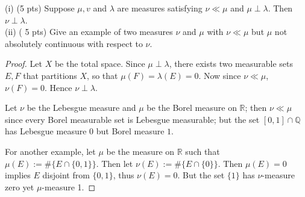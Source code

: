 
\begin{problem}
	(i) (5 pts) Suppose $\mu, v$ and $\lambda$ are measures satisfying $\nu \ll \mu$ and $\mu \perp \lambda$. Then $\nu \perp \lambda$.\\
(ii) ( 5 pts) Give an example of two measures $\nu$ and $\mu$ with $\nu \ll \mu$ but $\mu$ not absolutely continuous with respect to $\nu$.
\end{problem}
\begin{proof}	
	Let $X$ be the total space.
	Since $\mu \perp \lambda$, there exists two measurable sets $E, F$ that partitions $X$, so that $\mu(F) = \lambda(E) = 0$. Now since $\nu \ll \mu$, $\nu(F) = 0$. Hence $\nu \perp \lambda$.

	Let $\nu$ be the Lebesgue measure and $\mu$ be the Borel measure on $\mathbb{R}$; then $\nu \ll \mu$ since every Borel measurable set is Lebesgue measurable; but the set $[0,1] \cap \mathbb{Q}$ has Lebesgue measure $0$ but Borel measure $1$.

For another example, let $\mu$ be the measure on $\mathbb{R}$ such that $\mu(E) := \# \{E \cap \{0,1\} \} $. Then let $\nu(E) := \# \{E \cap \{0\} \}  $. Then $\mu(E) = 0$ implies $E$ disjoint from $\{0,1\} $, thus $\nu(E) = 0 $. But the set $\{1\}$ has $\nu$-measure zero yet $\mu$-measure 1.
\end{proof}

